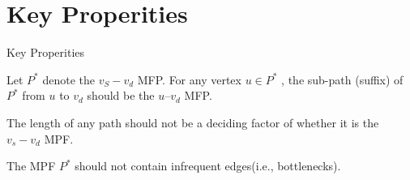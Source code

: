 \documentclass[mathserif]{beamer}
\begin{document}
\section{Key Properities}
\begin{frame}{Key Properities}
	\begin{property}
	Let $P^*$ denote the $v_S-v_d$ MFP. For any vertex $u \in P^*$ , the sub-path (suffix) of $P^*$ from $u$ to $v_d$ should be the $u–v_d$ MFP.
	\end{property}
	\begin{property}
	The length of any path should not be a deciding factor of whether it is the $v_s-v_d$ MPF.
	\end{property}
	\begin{property}
	The MPF $P^*$ should not contain infrequent edges(i.e., bottlenecks).
	\end{property}

\end{frame}
\end{document}
